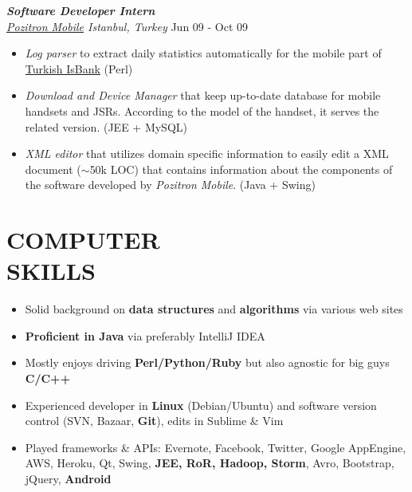\documentclass[line, margin]{res}
\begin{document}
\begin{resume}
	{\sl \textbf{Software Developer Intern} \\ \href{http://www.pozitron.com/}{Pozitron Mobile} Istanbul, Turkey} \hfill Jun 09 - Oct 09\\
	\vspace{-0.3cm}
	\begin{itemize} \itemsep -2pt
		\item \textit{Log parser} to extract daily statistics automatically for the mobile part of \href{http://www.isbank.com.tr/English/}{Turkish IsBank} (Perl)
		\item \textit{Download and Device Manager} that keep up-to-date database for mobile handsets  and JSRs. According to the model of the handset, it serves the related version. (JEE + MySQL)
		\item \textit{XML editor} that utilizes domain specific information to easily edit a XML document ($\sim$50k LOC) that contains information about the components of the software developed by \textit{Pozitron Mobile}. (Java + Swing)
	\end{itemize}

\section{COMPUTER \\ SKILLS} 
	\begin{itemize}
		\item Solid background on \textbf{data structures} and \textbf{algorithms} via various web sites
		\item \textbf{Proficient in Java} via preferably IntelliJ IDEA
		\item Mostly enjoys driving \textbf{Perl/Python/Ruby} but also agnostic for big guys \textbf{C/C++}
		\item Experienced developer in \textbf{Linux} (Debian/Ubuntu) and software version control (SVN, Bazaar, \textbf{Git}), edits in Sublime \& Vim
		\item Played frameworks \& APIs: Evernote, Facebook, Twitter, Google AppEngine, AWS, Heroku, Qt, Swing,  \textbf{JEE, RoR, Hadoop, Storm}, Avro, Bootstrap, jQuery, \textbf{Android}
	\end{itemize}
\end{resume}
\end{document}
